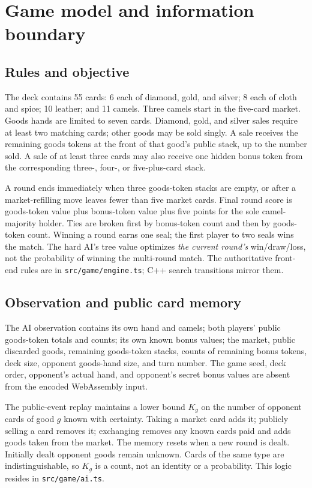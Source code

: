 \documentclass{article}
\newcommand{\code}[1]{\texttt{#1}}
\begin{document}
\section{Game model and information boundary}

\subsection{Rules and objective}

The deck contains 55 cards: 6 each of diamond, gold, and silver; 8 each of cloth and spice; 10 leather; and 11 camels. Three camels start in the five-card market. Goods hands are limited to seven cards. Diamond, gold, and silver sales require at least two matching cards; other goods may be sold singly. A sale receives the remaining goods tokens at the front of that good's public stack, up to the number sold. A sale of at least three cards may also receive one hidden bonus token from the corresponding three-, four-, or five-plus-card stack.

A round ends immediately when three goods-token stacks are empty, or after a market-refilling move leaves fewer than five market cards. Final round score is goods-token value plus bonus-token value plus five points for the sole camel-majority holder. Ties are broken first by bonus-token count and then by goods-token count. Winning a round earns one seal; the first player to two seals wins the match. The hard AI's tree value optimizes \emph{the current round's} win/draw/loss, not the probability of winning the multi-round match. The authoritative front-end rules are in \code{src/game/engine.ts}; C++ search transitions mirror them.

\subsection{Observation and public card memory}

The AI observation contains its own hand and camels; both players' public goods-token totals and counts; its own known bonus values; the market, public discarded goods, remaining goods-token stacks, counts of remaining bonus tokens, deck size, opponent goods-hand size, and turn number. The game seed, deck order, opponent's actual hand, and opponent's secret bonus values are absent from the encoded WebAssembly input.

The public-event replay maintains a lower bound $K_g$ on the number of opponent cards of good $g$ known with certainty. Taking a market card adds it; publicly selling a card removes it; exchanging removes any known cards paid and adds goods taken from the market. The memory resets when a new round is dealt. Initially dealt opponent goods remain unknown. Cards of the same type are indistinguishable, so $K_g$ is a count, not an identity or a probability. This logic resides in \code{src/game/ai.ts}.
\end{document}
